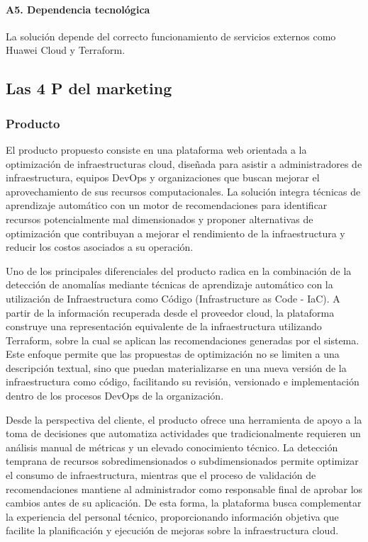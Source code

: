 \paragraph*{A5. Dependencia tecnológica}

La solución depende del correcto funcionamiento de servicios externos como Huawei Cloud y Terraform.

\subsection{Las 4 P del marketing}

\subsubsection{Producto}

El producto propuesto consiste en una plataforma web orientada a la optimización de infraestructuras cloud, diseñada para asistir a administradores de infraestructura, equipos DevOps y organizaciones que buscan mejorar el aprovechamiento de sus recursos computacionales. La solución integra técnicas de aprendizaje automático con un motor de recomendaciones para identificar recursos potencialmente mal dimensionados y proponer alternativas de optimización que contribuyan a mejorar el rendimiento de la infraestructura y reducir los costos asociados a su operación.

Uno de los principales diferenciales del producto radica en la combinación de la detección de anomalías mediante técnicas de aprendizaje automático con la utilización de Infraestructura como Código (Infrastructure as Code - IaC). A partir de la información recuperada desde el proveedor cloud, la plataforma construye una representación equivalente de la infraestructura utilizando Terraform, sobre la cual se aplican las recomendaciones generadas por el sistema. Este enfoque permite que las propuestas de optimización no se limiten a una descripción textual, sino que puedan materializarse en una nueva versión de la infraestructura como código, facilitando su revisión, versionado e implementación dentro de los procesos DevOps de la organización.

Desde la perspectiva del cliente, el producto ofrece una herramienta de apoyo a la toma de decisiones que automatiza actividades que tradicionalmente requieren un análisis manual de métricas y un elevado conocimiento técnico. La detección temprana de recursos sobredimensionados o subdimensionados permite optimizar el consumo de infraestructura, mientras que el proceso de validación de recomendaciones mantiene al administrador como responsable final de aprobar los cambios antes de su aplicación. De esta forma, la plataforma busca complementar la experiencia del personal técnico, proporcionando información objetiva que facilite la planificación y ejecución de mejoras sobre la infraestructura cloud.

